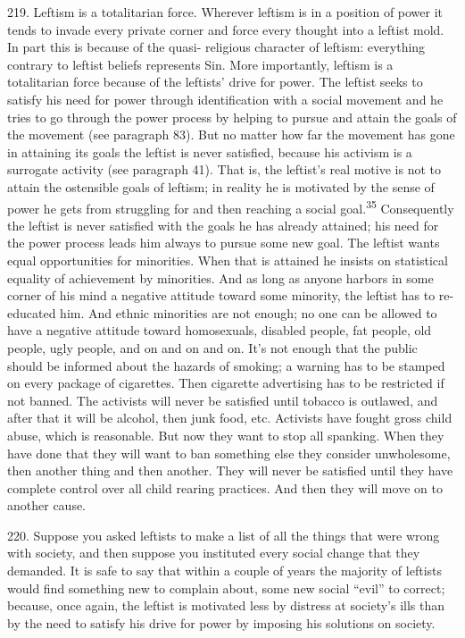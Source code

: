 \documentclass{article}
\begin{document}
219.  Leftism is a totalitarian force.  Wherever leftism is in a position of power it tends to invade 
every private corner and force every thought into a leftist mold.  In part this is because of the quasi-
religious character of leftism: everything contrary to leftist beliefs represents Sin.  More 
importantly, leftism is a totalitarian force because of the leftists’ drive for power.  The leftist seeks 
to  satisfy  his  need  for  power  through  identification  with  a  social  movement  and  he  tries  to  go  
through  the  power  process  by  helping  to  pursue  and  attain  the  goals  of  the  movement  (see  
paragraph 83).  But no matter how far the movement has gone in attaining its goals the leftist is 
never satisfied, because his activism is a surrogate activity (see paragraph 41).  That is, the leftist’s 
real motive is not to attain the ostensible goals of leftism; in reality he is motivated by the sense of 
power  he  gets  from  struggling  for  and  then  reaching  a  social  goal.\textsuperscript{35}  Consequently  the  leftist  is  
never satisfied  with the goals he has already  attained; his need for the power process leads him 
always to pursue some new goal.  The leftist wants equal opportunities for minorities.  When that 
is attained he insists on statistical equality of achievement by minorities.  And as long as anyone 
harbors in some corner of his mind a negative attitude toward some minority, the leftist has to re-
educated him.  And ethnic minorities are not enough; no one can be allowed to have a negative 
attitude toward homosexuals, disabled people, fat people, old people, ugly people, and on and on 
and on.  It’s not enough that the public should be informed about the hazards of smoking; a warning 
has to be stamped on every package of cigarettes.  Then cigarette advertising has to be restricted 
if not banned.  The activists will never be satisfied until tobacco is outlawed, and after that it will 
be alcohol, then junk food, etc.  Activists have fought gross child abuse, which is reasonable.  But 
now they want to stop all spanking.  When they have done that they will want to ban something 
else they consider unwholesome, then another thing and then another.  They will never be satisfied 
until they have complete control over all child rearing practices.  And then they will move on to 
another cause. \vspace{\baselineskip}

220.  Suppose you asked leftists to make a list of all the things that were wrong with society, and 
then suppose you instituted every social change that they demanded.  It is safe to say that within a 
couple of years the majority of leftists would find something new to complain about, some new 
social “evil” to correct; because, once again, the leftist is motivated less by distress at society’s ills 
than by the need to satisfy his drive for power by imposing his solutions on society. \vspace{\baselineskip}
\end{document}
